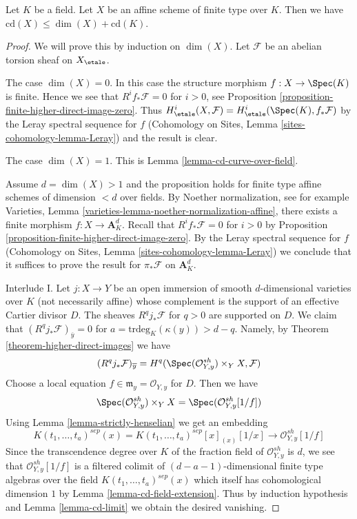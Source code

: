 \begin{proposition}
\label{proposition-cd-affine}
Let $K$ be a field. Let $X$ be an affine scheme of finite type over $K$.
Then we have $\text{cd}(X) \leq \dim(X) + \text{cd}(K)$.
\end{proposition}

\begin{proof}
We will prove this by induction on $\dim(X)$.
Let $\mathcal{F}$ be an abelian torsion sheaf on $X_\etale$.

\medskip\noindent
The case $\dim(X) = 0$. In this case the structure morphism
$f : X \to \Spec(K)$ is finite. Hence we see that $R^if_*\mathcal{F} = 0$
for $i > 0$, see Proposition \ref{proposition-finite-higher-direct-image-zero}.
Thus $H^i_\etale(X, \mathcal{F}) = H^i_\etale(\Spec(K), f_*\mathcal{F})$
by the Leray spectral sequence for $f$
(Cohomology on Sites, Lemma \ref{sites-cohomology-lemma-Leray})
and the result is clear.

\medskip\noindent
The case $\dim(X) = 1$. This is Lemma \ref{lemma-cd-curve-over-field}.

\medskip\noindent
Assume $d = \dim(X) > 1$ and the proposition holds for finite type
affine schemes of dimension $< d$ over fields.
By Noether normalization, see for example
Varieties, Lemma \ref{varieties-lemma-noether-normalization-affine},
there exists a finite morphism $f : X \to \mathbf{A}^d_K$.
Recall that $R^if_*\mathcal{F} = 0$ for $i > 0$ by
Proposition \ref{proposition-finite-higher-direct-image-zero}.
By the Leray spectral sequence for $f$
(Cohomology on Sites, Lemma \ref{sites-cohomology-lemma-Leray})
we conclude that it suffices to prove the result for $\pi_*\mathcal{F}$
on $\mathbf{A}^d_K$.

\medskip\noindent
Interlude I. Let $j : X \to Y$ be an open immersion of smooth
$d$-dimensional varieties over $K$ (not necessarily affine)
whose complement is the support of an effective Cartier divisor $D$.
The sheaves $R^qj_*\mathcal{F}$ for $q > 0$ are supported on $D$.
We claim that $(R^qj_*\mathcal{F})_{\overline{y}} = 0$
for $a = \text{trdeg}_K(\kappa(y)) > d - q$. Namely, by
Theorem \ref{theorem-higher-direct-images} we have
$$
(R^qj_*\mathcal{F})_{\overline{y}} =
H^q(\Spec(\mathcal{O}_{Y, y}^{sh}) \times_Y X, \mathcal{F})
$$
Choose a local equation $f \in \mathfrak m_y = \mathcal{O}_{Y, y}$
for $D$. Then we have
$$
\Spec(\mathcal{O}_{Y, y}^{sh}) \times_Y X =
\Spec(\mathcal{O}_{Y, y}^{sh}[1/f])
$$
Using Lemma \ref{lemma-strictly-henselian} we get an embedding
$$
K(t_1, \ldots, t_a)^{sep}(x) =
K(t_1, \ldots, t_a)^{sep}[x]_{(x)}[1/x]
\longrightarrow
\mathcal{O}_{Y, y}^{sh}[1/f]
$$
Since the transcendence degree over $K$ of the fraction field of
$\mathcal{O}_{Y, y}^{sh}$ is $d$, we see that $\mathcal{O}_{Y, y}^{sh}[1/f]$
is a filtered colimit of $(d - a - 1)$-dimensional finite type algebras over
the field $K(t_1, \ldots, t_a)^{sep}(x)$ which itself has cohomological
dimension $1$ by Lemma \ref{lemma-cd-field-extension}. Thus by induction
hypothesis and Lemma \ref{lemma-cd-limit}
we obtain the desired vanishing.


\end{proof}
